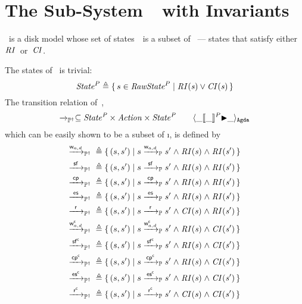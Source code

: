 
\section{The Sub-System~\ProgInv\ with Invariants}
\label{sec:ProgInv}
\ProgInv\ is a disk model whose set of states~\AgdaId{\ProgInvState}\ is a subset of \ProgState\ --- states that satisfy either $\mathit{RI}$~or~$\mathit{CI}$.

The states of \ProgInv\ is trivial:
$$\mathit{State}^P {}\triangleq{}{} \{\, s \in \mathit{RawState}^P \mid \mathit{RI(s) \lor CI(s)} \,\}$$
The transition relation of~\ProgInv,
$$\xrightarrow{}_{\mathbb P^\dagger} \subseteq \mathit{State^P} \times \mathit{Action} \times \mathit{State^P} \qquad \langle \_[\kern-1.5pt[\_]\kern-1.5pt]^P{\blacktriangleright}\_ \rangle_\mathtt{Agda} $$
which can be easily shown to be a subset of \i{\ttP{}}, is defined by
\begin{alignat*}{3}
	\ttPI{\awa{w}{\actw_{a, d}}} \defeq{}& \{\, (s, s') \mid s \ttP{\awa{w}{\actw_{a, d}}} s' \conj \i{RI(s)} \conj \i{RI(s')} \,\} \\
	\ttPI{\awa{w}\actf} \defeq{}& \{\, (s, s') \mid s \ttP{\awa{w}\actf} s' \conj \i{RI(s)} \conj \i{RI(s')} \,\} \\
    \ttPI{\awa{w}\actcp} \defeq{}& \{\, (s, s') \mid s \ttP{\awa{w}\actcp} s' \conj \i{RI(s)} \conj \i{RI(s')} \,\} \\
    \ttPI{\awa{w}\actes} \defeq{}& \{\, (s, s') \mid s \ttP{\awa{w}\actes} s' \conj \i{RI(s)} \conj \i{RI(s')} \,\} \\
	\ttPI{\awa{w}\actr} \defeq{}& \{\, (s, s') \mid s \ttP{\awa{w}\actr} s' \conj \i{CI(s)} \conj \i{RI(s')} \,\} \\
	\ttPI{\awa{w}{\actwc_{a, d}}} \defeq{}& \{\, (s, s') \mid s \ttP{\awa{w}{\actwc_{a, d}}} s' \conj \i{RI(s)} \conj \i{CI(s')} \,\} \\
	\ttPI{\awa{w}\actfc} \defeq{}& \{\, (s, s') \mid s \ttP{\awa{w}\actfc} s' \conj \i{RI(s)} \conj \i{CI(s')} \,\} \\
	\ttPI{\awa{w}\actcpc} \defeq{}& \{\, (s, s') \mid s \ttP{\awa{w}\actcpc} s' \conj \i{RI(s)} \conj \i{CI(s')} \,\} \\
	\ttPI{\awa{w}\actesc} \defeq{}& \{\, (s, s') \mid s \ttP{\awa{w}\actesc} s' \conj \i{RI(s)} \conj \i{CI(s')} \,\} \\
	\ttPI{\awa{w}\actrc} \defeq{}& \{\, (s, s') \mid s \ttP{\awa{w}\actrc} s' \conj \i{CI(s)} \conj \i{CI(s')} \,\} 
\end{alignat*}

